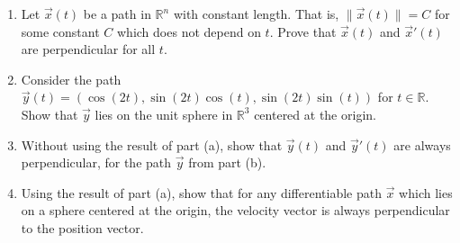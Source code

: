 \begin{problem}
\begin{enumerate}
\item Let $\vec{x}(t)$ be a path in $\mathbb{R}^n$ with constant length. That is, $\|\vec{x}(t)\|=C$ for some constant $C$ which does not depend on $t$. Prove that $\vec{x}(t)$ and $\vec{x}'(t)$ are perpendicular for all $t$.
\item Consider the path $\vec{y}(t) = (\cos(2t), \sin(2t)\cos(t), \sin(2t)\sin(t))$ for $t\in\mathbb{R}$. Show that $\vec{y}$ lies on the unit sphere in $\mathbb{R}^3$ centered at the origin.
\item Without using the result of part (a), show that $\vec{y}(t)$ and $\vec{y}'(t)$ are always perpendicular, for the path $\vec{y}$ from part (b).
\item Using the result of part (a), show that for any differentiable path $\vec{x}$ which lies on a sphere centered at the origin, the velocity vector is always perpendicular to the position vector.
\end{enumerate}
\end{problem}